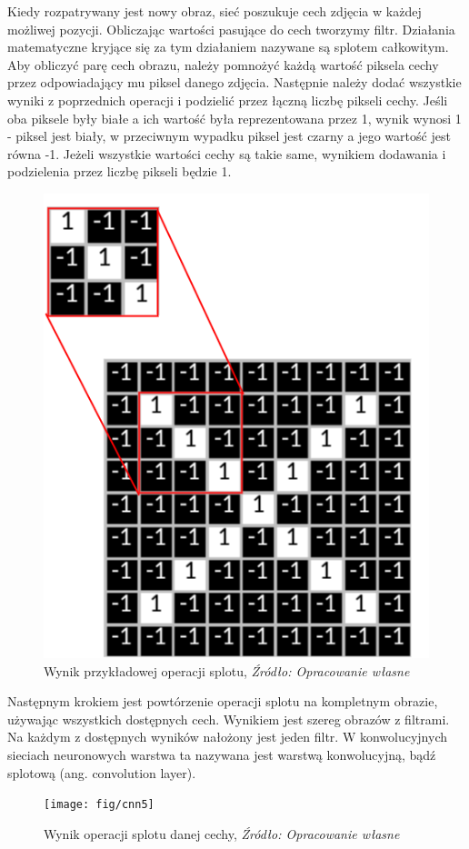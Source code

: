 \documentclass[brudnopis]{xmgr}
\begin{document}
Kiedy rozpatrywany jest nowy obraz, sieć poszukuje cech zdjęcia w każdej możliwej pozycji. Obliczając wartości pasujące do cech tworzymy filtr. Działania matematyczne kryjące się za tym działaniem nazywane są splotem całkowitym. Aby obliczyć parę cech obrazu, należy pomnożyć każdą wartość piksela cechy przez odpowiadający mu piksel danego zdjęcia. Następnie należy dodać wszystkie wyniki z poprzednich operacji i podzielić przez łączną liczbę pikseli cechy. Jeśli oba piksele były białe a ich wartość była reprezentowana przez 1, wynik wynosi 1 - piksel jest biały, w przeciwnym wypadku piksel jest czarny a jego wartość jest równa -1. Jeżeli wszystkie wartości cechy są takie same, wynikiem dodawania i podzielenia przez liczbę pikseli będzie 1.
\newpage

\begin{figure}[!tbh]
\centering
\includegraphics[width=.5\hsize]{fig/cnn4}
\caption{Wynik przykładowej operacji splotu, \emph{Źródło: Opracowanie własne}}
\end{figure}

Następnym krokiem jest powtórzenie operacji splotu na kompletnym obrazie, używając wszystkich dostępnych cech. Wynikiem jest szereg obrazów z filtrami. Na każdym z dostępnych wyników nałożony jest jeden filtr. W konwolucyjnych sieciach neuronowych warstwa ta nazywana jest warstwą konwolucyjną, bądź splotową (ang. convolution layer).

\begin{figure}[!tbh]
\centering
\texttt{[image: fig/cnn5]}
\caption{Wynik operacji splotu danej cechy, \emph{Źródło: Opracowanie własne}}
\end{figure}
\newpage
\end{document}
